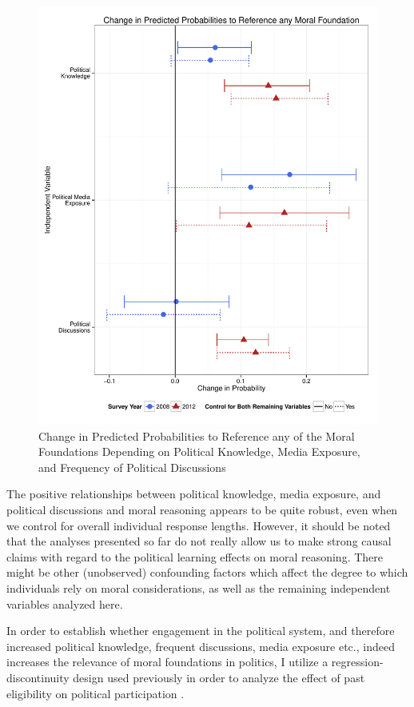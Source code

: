 \documentclass[12pt]{article}
\begin{document}
\begin{figure}\centering
\includegraphics[scale=.4]{../calc/fig/m3_learn.pdf}
\caption{Change in Predicted Probabilities to Reference any of the Moral Foundations Depending on Political Knowledge, Media Exposure, and Frequency of Political Discussions}\label{fig:m3_learn}
\end{figure}

The positive relationships between political knowledge, media exposure, and political discussions and moral reasoning appears to be quite robust, even when we control for overall individual response lengths. However, it should be noted that the analyses presented so far do not really allow us to make strong causal claims with regard to the political learning effects on moral reasoning. There might be other (unobserved) confounding factors which affect the degree to which individuals rely on moral considerations, as well as the remaining independent variables analyzed here.

In order to establish whether engagement in the political system, and therefore increased political knowledge, frequent discussions, media exposure etc., indeed increases the relevance of moral foundations in politics, I utilize a regression-discontinuity design used previously in order to analyze the effect of past eligibility on political participation \citep[see for example][]{meredith2009persistence}.
\end{document}
